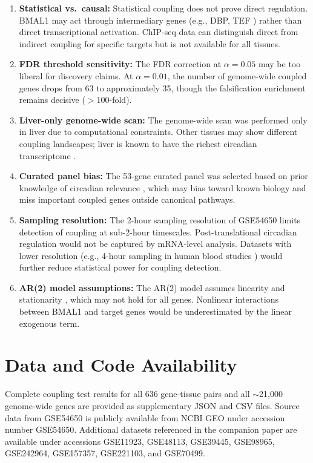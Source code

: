 \documentclass[11pt,letterpaper]{article}
\begin{document}
\begin{enumerate}
\item \textbf{Statistical vs.\ causal:} Statistical coupling does not prove direct regulation. BMAL1 may act through intermediary genes (e.g., DBP, TEF \citep{gachon2006parbzip}) rather than direct transcriptional activation. ChIP-seq data \citep{koike2012transcriptional} can distinguish direct from indirect coupling for specific targets but is not available for all tissues.
\item \textbf{FDR threshold sensitivity:} The FDR correction at $\alpha = 0.05$ may be too liberal for discovery claims. At $\alpha = 0.01$, the number of genome-wide coupled genes drops from 63 to approximately 35, though the falsification enrichment remains decisive ($>$100-fold).
\item \textbf{Liver-only genome-wide scan:} The genome-wide scan was performed only in liver due to computational constraints. Other tissues may show different coupling landscapes; liver is known to have the richest circadian transcriptome \citep{zhang2014circadian, storch2002extensive}.
\item \textbf{Curated panel bias:} The 53-gene curated panel was selected based on prior knowledge of circadian relevance \citep{panda2002coordinated, fu2003circadian}, which may bias toward known biology and miss important coupled genes outside canonical pathways.
\item \textbf{Sampling resolution:} The 2-hour sampling resolution of GSE54650 limits detection of coupling at sub-2-hour timescales. Post-translational circadian regulation \citep{masri2015circadian} would not be captured by mRNA-level analysis. Datasets with lower resolution (e.g., 4-hour sampling in human blood studies \citep{hughes2010jtk}) would further reduce statistical power for coupling detection.
\item \textbf{AR(2) model assumptions:} The AR(2) model assumes linearity and stationarity \citep{hamilton1994time, box2015time}, which may not hold for all genes. Nonlinear interactions between BMAL1 and target genes would be underestimated by the linear exogenous term.
\end{enumerate}

\section{Data and Code Availability}

Complete coupling test results for all 636 gene-tissue pairs and all $\sim$21,000 genome-wide genes are provided as supplementary JSON and CSV files. Source data from GSE54650 is publicly available from NCBI GEO \citep{barrett2013ncbi} under accession number GSE54650. Additional datasets referenced in the companion paper are available under accessions GSE11923, GSE48113, GSE39445, GSE98965, GSE242964, GSE157357, GSE221103, and GSE70499.
\end{document}

